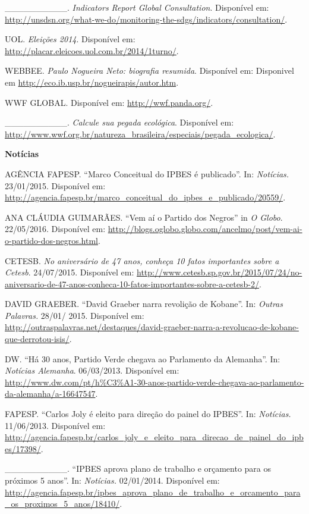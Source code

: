 \_\_\_\_\_\_\_\_\_\_. \emph{Indicators Report Global Consultation}.
Disponível em:
\url{http://unsdsn.org/what-we-do/monitoring-the-sdgs/indicators/consultation/}.

UOL. \emph{Eleições 2014}. Disponível em:
\href{http://placar.eleicoes.uol.com.br/2014/1turno/}{{http://placar.eleicoes.uol.com.br/2014/1turno/}}.

WEBBEE. \emph{Paulo Nogueira Neto: biografia resumida}. Disponível em:
Disponivel em \url{http://eco.ib.usp.br/nogueirapis/autor.htm}.

WWF GLOBAL. Disponível em: \url{http://wwf.panda.org/}.

\_\_\_\_\_\_\_\_\_\_. \emph{Calcule sua pegada ecológica}. Disponível
em:
\url{http://www.wwf.org.br/natureza_brasileira/especiais/pegada_ecologica/}.

\textbf{Notícias}

AGÊNCIA FAPESP. ``Marco Conceitual do IPBES é publicado''. In:
\emph{Notícias.} 23/01/2015. Disponível em:
\url{http://agencia.fapesp.br/marco_conceitual_do_ipbes_e_publicado/20559/}.

ANA CLÁUDIA GUIMARÃES. ``Vem aí o Partido dos Negros'' in \emph{O
Globo}. 22/05/2016. Disponível em:
\url{http://blogs.oglobo.globo.com/ancelmo/post/vem-ai-o-partido-dos-negros.html}.

CETESB. \emph{No aniversário de 47 anos, conheça 10 fatos importantes
sobre a Cetesb}. 24/07/2015. Disponível em:
\url{http://www.cetesb.sp.gov.br/2015/07/24/no-aniversario-de-47-anos-conheca-10-fatos-importantes-sobre-a-cetesb-2/}.

DAVID GRAEBER. ``David Graeber narra revolição de Kobane''. In:
\emph{Outras Palavras.} 28/01/ 2015. Disponível em:
\url{http://outraspalavras.net/destaques/david-graeber-narra-a-revolucao-de-kobane-que-derrotou-isis/}.

DW. ``Há 30 anos, Partido Verde chegava ao Parlamento da Alemanha''. In:
\emph{Notícias Alemanha}. 06/03/2013. Disponível em:
\url{http://www.dw.com/pt/h\%C3\%A1-30-anos-partido-verde-chegava-ao-parlamento-da-alemanha/a-16647547}.

FAPESP. ``Carlos Joly é eleito para direção do painel do IPBES''. In:
\emph{Notícias.} 11/06/2013. Disponível em:
\url{http://agencia.fapesp.br/carlos_joly_e_eleito_para_direcao_de_painel_do_ipbes/17398/}.

\_\_\_\_\_\_\_\_\_\_. ``IPBES aprova plano de trabalho e orçamento para
os próximos 5 anos''. In: \emph{Notícias.} 02/01/2014. Disponível em:
\url{http://agencia.fapesp.br/ipbes_aprova_plano_de_trabalho_e_orcamento_para_os_proximos_5_anos/18410/}.

